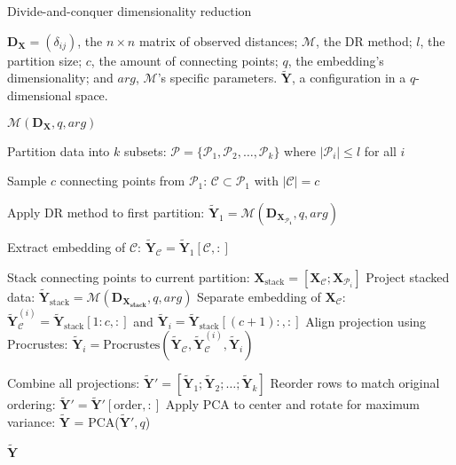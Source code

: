 \begin{algorithm}
    \caption{Divide-and-conquer dimensionality reduction}
    \label{alg:DivideConquer}
    
    \begin{algorithmic}[1]
    \REQUIRE $\mathbf{D_X} = (\delta_{ij})$, the $n \times n$ matrix of observed distances; $\mathcal{M}$, the DR method; $l$, the partition size; $c$, the amount of connecting points; $q$, the embedding's dimensionality; and $arg$, $\mathcal{M}$'s specific parameters.
    \ENSURE $\mathbf{\tilde{Y}}$, a configuration in a $q$-dimensional space.
    
        \RETURN $\mathcal{M}(\mathbf{D_X}, q, arg)$
    \ENDIF
    
    \STATE Partition data into $k$ subsets: $\mathcal{P} = \{\mathcal{P}_1, \mathcal{P}_2, \ldots, \mathcal{P}_k\}$ where $|\mathcal{P}_i| \leq l$ for all $i$
    
    \STATE Sample $c$ connecting points from $\mathcal{P}_1$: $\mathcal{C} \subset \mathcal{P}_1$ with $|\mathcal{C}| = c$
    
    \STATE Apply DR method to first partition: $\mathbf{\tilde{Y}}_1 = \mathcal{M}(\mathbf{D_{X_{\mathcal{P}_1}}}, q, arg)$

    \STATE Extract embedding of $\mathcal{C}$: $\mathbf{\tilde{Y}}_\mathcal{C} = \mathbf{\tilde{Y}}_1[{\mathcal{C}},:]$
    
        \STATE Stack connecting points to current partition: $\mathbf{X}_{\text{stack}} = [\mathbf{X}_{\mathcal{C}}; \mathbf{X}_{\mathcal{P}_i}]$
        \STATE Project stacked data: $\mathbf{\tilde{Y}}_{\text{stack}} = \mathcal{M}(\mathbf{D_{X_{\text{stack}}}}, q, arg)$
        \STATE Separate embedding of $\mathbf{X}_{\mathcal{C}}$: $\mathbf{\tilde{Y}}_{\mathcal{C}}^{(i)} = \mathbf{\tilde{Y}}_{\text{stack}}[1:c,:]$ and $\mathbf{\tilde{Y}}_i = \mathbf{\tilde{Y}}_{\text{stack}}[(c+1):,:]$
        \STATE Align projection using Procrustes: $\mathbf{\tilde{Y}}_i = \text{Procrustes}(\mathbf{\tilde{Y}}_\mathcal{C}, \mathbf{\tilde{Y}}_{\mathcal{C}}^{(i)}, \mathbf{\tilde{Y}}_i)$
    \ENDFOR
    
    \STATE Combine all projections: $\mathbf{\tilde{Y}}' = [\mathbf{\tilde{Y}}_1; \mathbf{\tilde{Y}}_2; \ldots; \mathbf{\tilde{Y}}_k]$
    \STATE Reorder rows to match original ordering: $\mathbf{\tilde{Y}}' = \mathbf{\tilde{Y}}'[\text{order},:]$
    \STATE Apply PCA to center and rotate for maximum variance: $\mathbf{\tilde{Y}}$ = PCA($\mathbf{\tilde{Y}}', q$)
    
    \RETURN $\mathbf{\tilde{Y}}$
    \end{algorithmic}
\end{algorithm}

